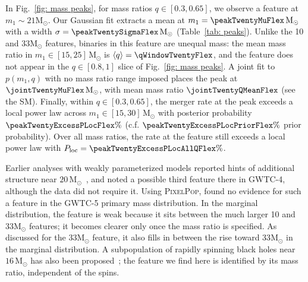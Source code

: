 \documentclass[%
 reprint,
 amsmath,amssymb,
 aps,
 prl,
 nofootinbib,nobibnotes,
]{revtex4-2}
\newcommand{\Msun}{\ensuremath{\mathrm{M}_{\odot}}}
\newcommand{\PixelPop}{\textsc{PixelPop}\xspace}
\newcommand{\featTen}{10\xspace}
\newcommand{\featTwenty}{21\xspace}
\newcommand{\featThirtyFive}{33\xspace}
\begin{document}
In Fig.~\ref{fig: mass peaks}, for mass ratios $q \in [0.3, 0.65]$, we observe a feature at $m_1\sim \featTwenty \Msun$. Our Gaussian fit extracts a mean at $m_1 = \peakTwentyMuFlex\,\Msun$ with a width $\sigma = \peakTwentySigmaFlex\,\Msun$ (Table~\ref{tab: peaks}). Unlike the \featTen and \featThirtyFive $\Msun$ features, binaries in this feature are unequal mass: the mean mass ratio in $m_1 \in [15, 25]\,\Msun$ is $\langle q \rangle = \qWindowTwentyFlex$, and the feature does not appear in the $q \in [0.8, 1]$ slice of Fig.~\ref{fig: mass peaks}. A joint fit to $p(m_1, q)$ with no mass ratio range imposed places the peak at $\jointTwentyMuFlex\,\Msun$, with mean mass ratio $\jointTwentyQMeanFlex$ (see the SM). Finally, within $q \in [0.3, 0.65]$, the merger rate at the peak exceeds a local power law across $m_1 \in [15, 30]\,\Msun$ with posterior probability $\peakTwentyExcessPLocFlex\%$ (c.f. $\peakTwentyExcessPLocPriorFlex\%$ prior probability). Over all mass ratios, the rate at the feature still exceeds a local power law with $P_{\rm loc} = \peakTwentyExcessPLocAllQFlex\%$.


Earlier analyses with weakly parameterized models reported hints of additional structure near $20\,\Msun$~\cite{Tiwari:2020otp, Tiwari:2021yvr, Edelman:2022ydv, Toubiana:2023egi, MaganaHernandez:2024uty}, and \citet{LIGOScientific:2025pvj} noted a possible third feature there in \ac{GWTC-4}, although the data did not require it. Using \PixelPop, \citet{LIGOScientific:2026ctl} found no evidence for such a feature in the \ac{GWTC-5} primary mass distribution. In the marginal distribution, the feature is weak because it sits between the much larger \featTen and \featThirtyFive $\Msun$ features; it becomes clearer only once the mass ratio is specified. As discussed for the \featThirtyFive $\Msun$ feature, it also fills in between the rise toward \featThirtyFive $\Msun$ in the marginal distribution. A subpopulation of rapidly spinning black holes near $16\,\Msun$ has also been proposed~\cite{Plunkett:2026pxt, Tong:2025xir, Farah:2026jlc}; the feature we find here is identified by its mass ratio, independent of the spins.
\end{document}
